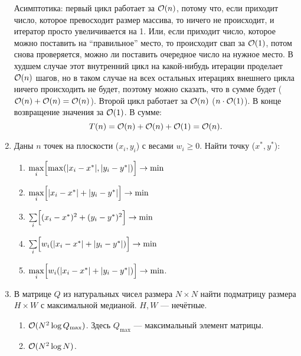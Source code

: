 \begin{enumerate}
\begin{solution}
      Асимптотика: первый цикл работает за $\mathcal{O}(n)$, потому что, если приходит число, которое превосходит размер массива, то ничего не происходит, и итератор просто увеличивается на 1. Или, если приходит число, которое можно поставить на ``правильное'' место, то происходит свап за $\mathcal{O}(1)$, потом снова проверяется, можно ли поставить очередное число на нужное место. В худшем случае этот внутренний цикл на какой-нибудь итерации проделает $\mathcal{O}(n)$ шагов, но в таком случае на всех остальных итерациях внешнего цикла ничего происходить не будет, поэтому можно сказать, что в сумме будет ($\mathcal{O}(n)+\mathcal{O}(n)=\mathcal{O}(n)$). Второй цикл работает за $\mathcal{O}(n)$ ($n \cdot \mathcal{O}(1)$). В конце возвращение значения за $\mathcal{O}(1)$. В сумме:
      \begin{equation}
        T(n) = \mathcal{O}(n) + \mathcal{O}(n) + \mathcal{O}(1) = \mathcal{O}(n).
      \end{equation}
    \end{solution}

  \item
    Даны $n$ точек на плоскости ($x_i, y_i$) с весами $w_i \ge 0$. Найти точку ($x^{*}, y^{*}$):
    \begin{enumerate}
      \item {} $\max\limits_i \Bigl[ \max(|x_i-x^{*}|, |y_i-y^{*}|) \Bigr] \rightarrow \min$
      \item {} $\max\limits_i \Bigl[ |x_i-x^{*}|+|y_i-y^{*}|  \Bigr] \rightarrow \min$
      \item {} $\sum\limits_i \Bigl[ (x_i-x^{*})^2+(y_i-y^{*})^2  \Bigr] \rightarrow \min$
      \item $\sum\limits_i \Bigl[ w_i(|x_i-x^{*}|+|y_i-y^{*}|) \Bigr] \rightarrow \min$
      \item $\max\limits_i \Bigl[ w_i(|x_i-x^{*}|+|y_i-y^{*}|) \Bigr] \rightarrow \min$.
    \end{enumerate}

  \item
    В матрице $Q$ из натуральных чисел размера $N \times N$ найти подматрицу размера $H \times W$
    с максимальной медианой. $H, W$ --- нечётные.
    \begin{enumerate}
      \item $\mathcal{O}(N^2 \log{Q_{\max}})$. Здесь $Q_{\max}$ --- максимальный элемент матрицы.
      \item $\mathcal{O}(N^2 \log{N})$.
    \end{enumerate}

    

\end{enumerate}
